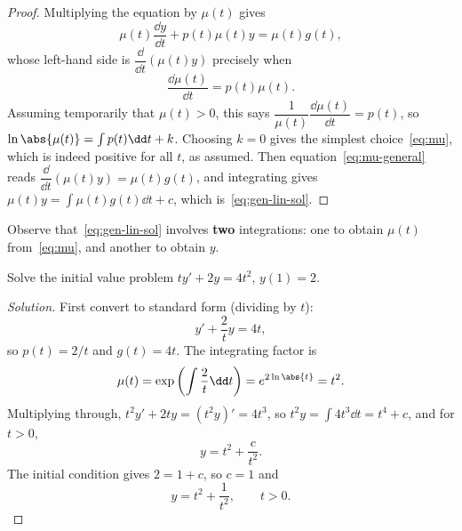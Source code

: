 \begin{proof}
	Multiplying the equation by \(\mu(t)\) gives
	\begin{equation}\label{eq:mu-general}
		\mu(t) \frac{\dd y}{\dd t} + p(t) \mu(t) y = \mu(t) g(t),
	\end{equation}
	whose left-hand side is \(\dfrac{\dd}{\dd t}(\mu(t) y)\) precisely when
	\[
		\frac{\dd \mu(t)}{\dd t} = p(t)\mu(t).
	\]
	Assuming temporarily that \(\mu(t) > 0\), this says
	\(\dfrac{1}{\mu(t)}\dfrac{\dd\mu(t)}{\dd t} = p(t)\), so
	\(\ln\abs{\mu(t)} = \int p(t) \dd t + k\). Choosing \(k = 0\) gives the simplest
	choice~\eqref{eq:mu}, which is indeed positive for all \(t\), as assumed. Then
	equation~\eqref{eq:mu-general} reads
	\(\dfrac{\dd}{\dd t}(\mu(t) y) = \mu(t) g(t)\), and integrating gives
	\(\mu(t) y = \int \mu(t) g(t) \dd t + c\), which is~\eqref{eq:gen-lin-sol}.
\end{proof}

\begin{remark}
	Observe that~\eqref{eq:gen-lin-sol} involves \textbf{two} integrations: one to obtain
	\(\mu(t)\) from~\eqref{eq:mu}, and another to obtain \(y\).
\end{remark}

\begin{eg}
	Solve the initial value problem \(ty' + 2y = 4t^2\), \(y(1) = 2\).
\end{eg}

\begin{proof}[Solution]
	First convert to standard form (dividing by \(t\)):
	\[
		y' + \frac{2}{t} y = 4t,
	\]
	so \(p(t) = 2/t\) and \(g(t) = 4t\). The integrating factor is
	\[
		\mu(t) = \exp\left( \int \frac{2}{t} \dd t \right) = e^{2\ln\abs{t}} = t^2.
	\]
	Multiplying through, \(t^2 y' + 2ty = (t^2 y)' = 4t^3\), so
	\(t^2 y = \int 4t^3 \dd t = t^4 + c\), and for \(t > 0\),
	\[
		y = t^2 + \frac{c}{t^2}.
	\]
	The initial condition gives \(2 = 1 + c\), so \(c = 1\) and
	\[
		y = t^2 + \frac{1}{t^2}, \qquad t > 0.
	\]
\end{proof}

